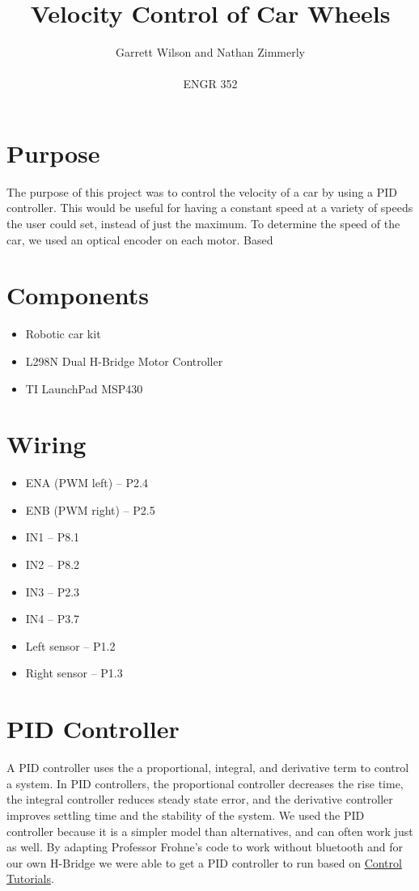 \documentclass{article}
\begin{document}
\title{Velocity Control of Car Wheels}
\author{Garrett Wilson and Nathan Zimmerly \\ \\
ENGR 352}
\maketitle

\clearpage

\tableofcontents

\pagebreak

\section{Purpose}
The purpose of this project was to control the velocity of a car by using a PID controller. This would be useful for having a constant speed at a variety of speeds the user could set, instead of just the maximum. To determine the speed of the car, we used an optical encoder on each motor. Based 

\section{Components}
\begin{itemize}
\item Robotic car kit
\item L298N Dual H-Bridge Motor Controller
\item TI LaunchPad MSP430
\end{itemize}

\section{Wiring}
\begin{itemize}
\item ENA (PWM left) -- P2.4
\item ENB (PWM right) -- P2.5
\item IN1 -- P8.1
\item IN2 -- P8.2
\item IN3 -- P2.3
\item IN4 -- P3.7
\item Left sensor -- P1.2
\item Right sensor -- P1.3
\end{itemize}

\section{PID Controller}
A PID controller uses the a proportional, integral, and derivative term to control a system. In PID controllers, the proportional controller decreases the rise time, the integral controller reduces steady state error, and the derivative controller improves settling time and the stability of the system. We used the PID controller because it is a simpler model than alternatives, and can often work just as well. By adapting Professor Frohne's code to work without bluetooth and for our own H-Bridge we were able to get a PID controller to run based on \href{http://ctms.engin.umich.edu/CTMS/index.php}{Control Tutorials}.
\end{document}
